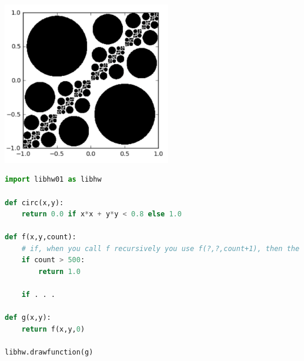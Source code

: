 \documentclass[letterpaper,11pt]{amsart}
\theoremstyle{plain}
\theoremstyle{definition}
\begin{document}
\begin{center}
\noindent\includegraphics[width=2.9in]{fractaa.png}
\end{center}
\begin{lstlisting}[language=python]
import libhw01 as libhw

def circ(x,y):
    return 0.0 if x*x + y*y < 0.8 else 1.0

def f(x,y,count):
    # if, when you call f recursively you use f(?,?,count+1), then the count variable will keep track of how many times f called itself (how deep you are in the recursion tree if you like) and will stop calling itself indefinitely for bad values
    if count > 500: 
        return 1.0
    
    if . . .
    
def g(x,y):
    return f(x,y,0)

libhw.drawfunction(g)
\end{lstlisting}


\newpage
\end{document}
